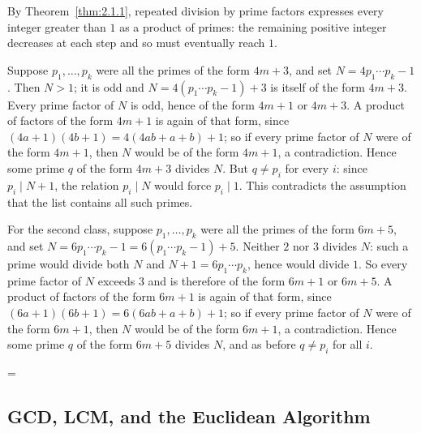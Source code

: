 \documentclass[11pt]{article}
\makeatletter
\theoremstyle{ntstyle}
\let\nt@closedisplay\]
\def\nt@guardedclose{\@ifnextchar\par{\nt@closeafterpar}{\@ifnextchar\end{\postdisplaypenalty\@M\nt@closedisplay}{\nt@closedisplay}}}
\def\nt@closeafterpar\par{\@ifnextchar\par{\nt@closeafterpar}{\@ifnextchar\end{\postdisplaypenalty\@M\nt@closedisplay\par}{\nt@closedisplay\par}}}
\renewenvironment{proof}[1][\proofname]{\par
  \pushQED{\qed}\normalfont\topsep\medskipamount\edef\nt@afterproof{\@endparpenalty=\the\@endparpenalty\relax}\@beginparpenalty\@M\@endparpenalty\@M\let\]\nt@guardedclose\trivlist\item[]\textit{#1\@addpunct{.}} \ignorespaces}{\ifvmode\addpenalty\@M\fi\popQED\nt@afterproof\endtrivlist\@endpefalse}
\makeatother
\begin{document}
\begin{proof} By Theorem~\ref{thm:2.1.1}, repeated division by prime
	factors expresses every integer greater than $1$ as a product of primes:
	the remaining positive integer decreases at each step and so must
	eventually reach $1$.

	Suppose $p_1,\ldots,p_k$ were all the primes
	of the form $4m+3$, and set $N=4p_1\cdots p_k-1$. Then $N>1$; it is odd and
	$N=4(p_1\cdots p_k-1)+3$ is itself of the form $4m+3$. Every prime factor
	of $N$ is odd, hence of the form $4m+1$ or $4m+3$. A product of factors
	of the form $4m+1$ is again of that form, since
	$(4a+1)(4b+1)=4(4ab+a+b)+1$; so if every prime factor of $N$ were of the
	form $4m+1$, then $N$ would be of the form $4m+1$, a contradiction. Hence
	some prime $q$ of the form $4m+3$ divides $N$. But $q\neq p_i$ for every $i$: since $p_i\mid N+1$, the relation $p_i\mid N$ would force $p_i\mid1$. This contradicts the assumption that the list contains all such primes.

	For the second class, suppose $p_1,\ldots,p_k$ were all the primes of the
	form $6m+5$, and set $N=6p_1\cdots p_k-1=6(p_1\cdots p_k-1)+5$. Neither
	$2$ nor $3$ divides $N$: such a prime would divide both $N$ and
	$N+1=6p_1\cdots p_k$, hence would divide $1$. So every prime factor of
	$N$ exceeds $3$ and is therefore of the form $6m+1$ or $6m+5$. A product
	of factors of the form $6m+1$ is again of that form, since
	$(6a+1)(6b+1)=6(6ab+a+b)+1$; so if every prime factor of $N$ were of the
	form $6m+1$, then $N$ would be of the form $6m+1$, a contradiction. Hence
	some prime $q$ of the form $6m+5$ divides $N$, and as before $q\neq p_i$
	for all $i$.\qedhere

\end{proof}
\subsection{GCD, LCM, and the Euclidean Algorithm}
\end{document}
